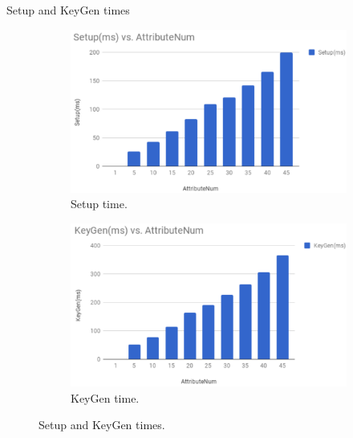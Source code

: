 \documentclass[11pt]{beamer}
\begin{document}
\begin{frame}{Setup and KeyGen times}

\begin{figure}
	\begin{subfigure}{.5\textwidth}
		\centering
		\includegraphics[scale=0.17]{setuptime.png}
		\caption{Setup time.}
		\label{fig:setuptime}
	\end{subfigure}%
	\begin{subfigure}{.5\textwidth}
		\centering
		\includegraphics[scale=0.17]{keygentime.png}
		\caption{KeyGen time.}
		\label{fig:keygentime}
	\end{subfigure}
	\caption{Setup and KeyGen times.}
\end{figure}

\end{frame}
\end{document}
